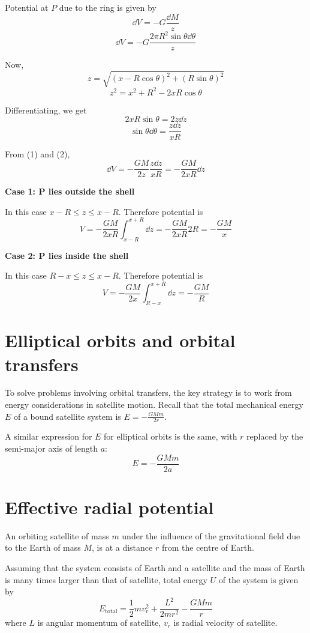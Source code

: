 Potential at $P$ due to the ring is given by
\[ \dd{V} = -G\frac{\dd{M}}{z} \] 
\begin{equation}\tag{1}
\dd{V} = -G\frac{2\pi R^2\sin\theta\dd{\theta}}{z}
\end{equation}

Now, 
\[ z = \sqrt{(x-R\cos\theta)^2 + (R\sin\theta)^2} \]
\[ z^2 = x^2 + R^2 - 2xR\cos\theta \]

Differentiating, we get
\[ 2xR\sin\theta=2z\dd{z} \]
\begin{equation}\tag{2}
\sin\theta\dd{\theta} = \frac{z\dd{z}}{xR}
\end{equation}

From (1) and (2),
\[ \dd{V} = -\frac{GM}{2z}\frac{z\dd{z}}{xR} = -\frac{GM}{2xR}\dd{z} \]

\textbf{Case 1: P lies outside the shell}

In this case $x-R \le z \le x-R$. Therefore potential is 
\[ V = -\frac{GM}{2xR}\int_{x-R}^{x+R}\dd{z} = -\frac{GM}{2xR}2R = -\frac{GM}{x} \]

\textbf{Case 2: P lies inside the shell}

In this case $R-x \le z \le x-R$. Therefore potential is 
\[ V=-\frac{GM}{2x}\int_{R-x}^{x+R}\dd{z}=-\frac{GM}{R} \]
\pagebreak

\section{Elliptical orbits and orbital transfers}
To solve problems involving orbital transfers, the key strategy is to work from energy considerations in satellite motion. Recall that the total mechanical energy $E$ of a bound satellite system is $E=-\frac{GMm}{2r}$.

A similar expression for $E$ for elliptical orbits is the same, with $r$ replaced by the semi-major axis of length $a$:
\[ E=-\frac{GMm}{2a} \]
\pagebreak

\section{Effective radial potential}
An orbiting satellite of mass $m$ under the influence of the gravitational field due to the Earth of mass $M$, is at a distance $r$ from the centre of Earth.

Assuming that the system consists of Earth and a satellite and the mass of Earth is many times larger than that of satellite, total energy $U$ of the system is given by 
\[ E_\text{total} = \frac{1}{2}mv_r^2 + \frac{L^2}{2mr^2} - \frac{GMm}{r} \]
where $L$ is angular momentum of satellite, $v_r$ is radial velocity of satellite.

